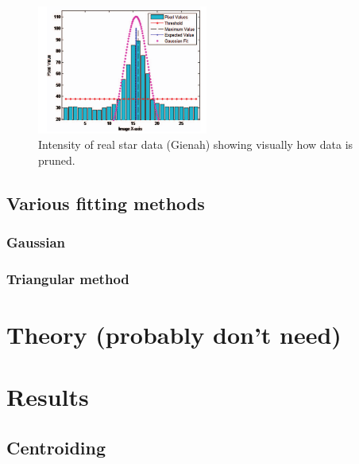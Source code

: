 \documentclass[aps,pra,a4paper,nofootinbib,onecolumn,tightenlines,longbibliography,12pt,amsfonts,amssymb,amsmath,floatfix]{revtex4-2} %
\begin{document}
    \begin{figure}[H]
      \begin{center}
        \includegraphics[width=0.5\textwidth]{litreview.png}
      \end{center}
      \caption{Intensity of real star data (Gienah) showing visually how data is pruned. \cite{rawashdeh2014image}}
      \label{fig:1}
    \end{figure}
  
  
  \subsection{Various fitting methods} %
  \label{sub:Various fitting methods}
  
    \subsubsection{Gaussian} %
    \label{ssub:Gaussian}


    
    \subsubsection{Triangular method} %
    \label{ssub:Triangular method}
  


\section{Theory (probably don't need)} %
\label{sec:Theory}



\section{Results} %
\label{sec:Results}

  \subsection{Centroiding} %
  \label{sub:Centroiding_results}
  
\end{document}
